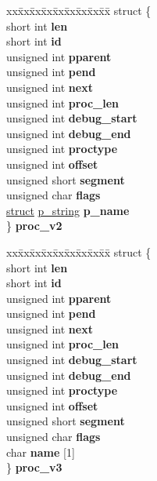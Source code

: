 \begin{DoxyCompactItemize}
\begin{tabbing}
\end{tabbing}\item 
\mbox{\label{unioncodeview__symbol_a462a344d3fb73f2f2e87a2fd87d8028a}} 
\begin{tabbing}
xx\=xx\=xx\=xx\=xx\=xx\=xx\=xx\=xx\=\kill
struct \{\\
\>short int {\bfseries len}\\
\>short int {\bfseries id}\\
\>unsigned int {\bfseries pparent}\\
\>unsigned int {\bfseries pend}\\
\>unsigned int {\bfseries next}\\
\>unsigned int {\bfseries proc\_len}\\
\>unsigned int {\bfseries debug\_start}\\
\>unsigned int {\bfseries debug\_end}\\
\>unsigned int {\bfseries proctype}\\
\>unsigned int {\bfseries offset}\\
\>unsigned short {\bfseries segment}\\
\>unsigned char {\bfseries flags}\\
\>\hyperlink{interfacestruct}{struct} \hyperlink{structp__string}{p\_string} {\bfseries p\_name}\\
\} {\bfseries proc\_v2}\\

\end{tabbing}\item 
\mbox{\label{unioncodeview__symbol_a07afba1916473db4bfb420294957a1e5}} 
\begin{tabbing}
xx\=xx\=xx\=xx\=xx\=xx\=xx\=xx\=xx\=\kill
struct \{\\
\>short int {\bfseries len}\\
\>short int {\bfseries id}\\
\>unsigned int {\bfseries pparent}\\
\>unsigned int {\bfseries pend}\\
\>unsigned int {\bfseries next}\\
\>unsigned int {\bfseries proc\_len}\\
\>unsigned int {\bfseries debug\_start}\\
\>unsigned int {\bfseries debug\_end}\\
\>unsigned int {\bfseries proctype}\\
\>unsigned int {\bfseries offset}\\
\>unsigned short {\bfseries segment}\\
\>unsigned char {\bfseries flags}\\
\>char {\bfseries name} \mbox{[}1\mbox{]}\\
\} {\bfseries proc\_v3}\\


\end{tabbing}
\end{DoxyCompactItemize}

